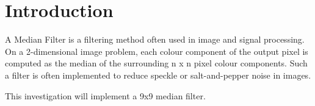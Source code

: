 \section{Introduction}
A Median Filter is a filtering method often used in image and signal processing. On a 2-dimensional image problem, each colour component of the output pixel is computed as the median of the surrounding n x n pixel colour components. Such a filter is often implemented to reduce speckle or salt-and-pepper noise in images\cite{NSP}.

This investigation will implement a 9x9 median filter.


